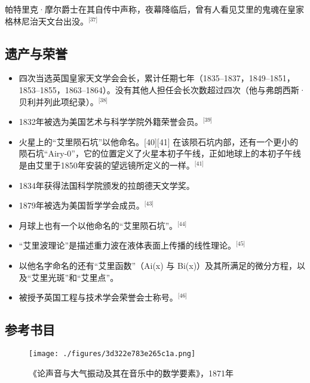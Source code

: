 帕特里克·摩尔爵士在其自传中声称，夜幕降临后，曾有人看见艾里的鬼魂在皇家格林尼治天文台出没。\(^\text{[37]}\)
\subsection{遗产与荣誉}
\begin{itemize}
\item 四次当选英国皇家天文学会会长，累计任期七年（1835–1837，1849–1851，1853–1855，1863–1864）。没有其他人担任会长次数超过四次（他与弗朗西斯·贝利并列此项纪录）。\(^\text{[38]}\)
\item 1832年被选为美国艺术与科学学院外籍荣誉会员。\(^\text{[39]}\)
\item 火星上的“艾里陨石坑”以他命名。[40][41] 在该陨石坑内部，还有一个更小的陨石坑“Airy-0”，它的位置定义了火星本初子午线，正如地球上的本初子午线是由艾里于1850年安装的望远镜所定义的一样。\(^\text{[41]}\)
\item 1834年获得法国科学院颁发的拉朗德天文学奖。
\item 1879年被选为美国哲学学会成员。\(^\text{[43]}\)
\item 月球上也有一个以他命名的“艾里陨石坑”。\(^\text{[44]}\)
\item “艾里波理论”是描述重力波在液体表面上传播的线性理论。\(^\text{[45]}\)
\item 以他名字命名的还有“艾里函数”（Ai(x) 与 Bi(x)）及其所满足的微分方程，以及“艾里光斑”和“艾里点”。
\item 被授予英国工程与技术学会荣誉会士称号。\(^\text{[46]}\)
\end{itemize}
\subsection{参考书目}
\begin{figure}[ht]
\centering
\texttt{[image: ./figures/3d322e783e265c1a.png]}
\caption{《论声音与大气振动及其在音乐中的数学要素》，1871年} \label{fig_AL_10}
\end{figure}
